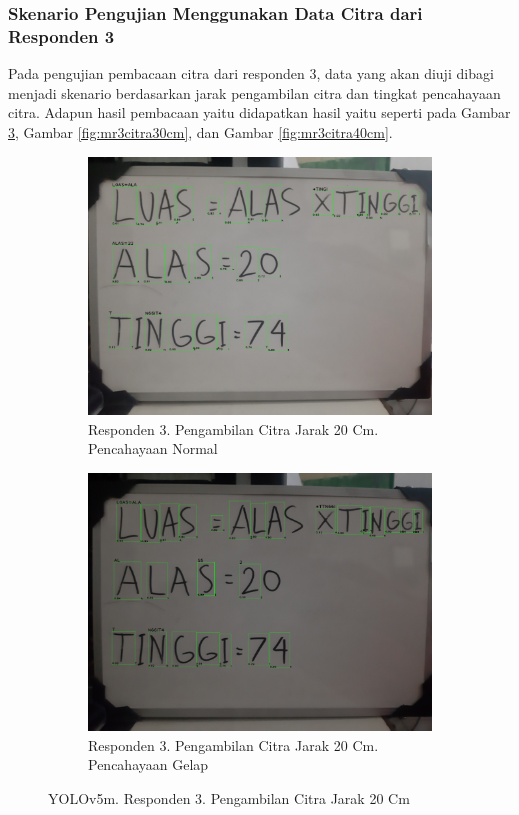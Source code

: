 \subsubsection{Skenario Pengujian Menggunakan Data Citra dari Responden 3}
\label{subsubsec:mskenarioresponden3}

Pada pengujian pembacaan citra dari responden 3, data yang akan diuji dibagi menjadi skenario berdasarkan jarak pengambilan citra dan tingkat pencahayaan citra. Adapun hasil pembacaan yaitu didapatkan hasil yaitu seperti pada Gambar \ref*{fig:mr3citra20cm}, Gambar \ref*{fig:mr3citra30cm}, dan Gambar \ref*{fig:mr3citra40cm}.

\begin{figure}[H]
  \begin{subfigure}{.5\textwidth}
    \centering
    \captionsetup{width=.8\linewidth}
    \includegraphics[width=.8\linewidth]{gambar/yolov5m/responden3/hans20cm00-result.jpg}
    \caption{Responden 3. Pengambilan Citra Jarak 20 Cm. Pencahayaan Normal}
    \label{fig:mr3tcitra20cm}
  \end{subfigure}%
  \begin{subfigure}{.5\textwidth}
    \centering
    \captionsetup{width=.8\linewidth}
    \includegraphics[width=.8\linewidth]{gambar/yolov5m/responden3/hans20cm10-result.jpg}
    \caption{Responden 3. Pengambilan Citra Jarak 20 Cm. Pencahayaan Gelap}
    \label{fig:mr3gcitra20cm}
  \end{subfigure}
  \caption{YOLOv5m. Responden 3. Pengambilan Citra Jarak 20 Cm}
  \label{fig:mr3citra20cm}
\end{figure}

